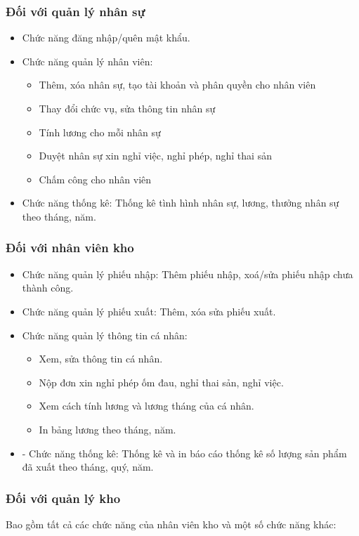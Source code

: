 \documentclass[a4paper,12pt]{report}
\begin{document}
\subsubsection{Đối với quản lý nhân sự}
\begin{itemize}
    \item Chức năng đăng nhập/quên mật khẩu.
    \item Chức năng quản lý nhân viên:
          \begin{itemize}
              \item Thêm, xóa nhân sự, tạo tài khoản và phân quyền cho nhân viên
              \item Thay đổi chức vụ, sửa thông tin nhân sự
              \item Tính lương cho mỗi nhân sự
              \item Duyệt nhân sự xin nghỉ việc, nghỉ phép, nghỉ thai sản
              \item Chấm công cho nhân viên
          \end{itemize}
    \item Chức năng thống kê: Thống kê tình hình nhân sự, lương, thưởng nhân sự theo tháng, năm.
\end{itemize}
\subsubsection{Đối với nhân viên kho}
\begin{itemize}
    \item Chức năng quản lý phiếu nhập: Thêm phiếu nhập, xoá/sửa phiếu nhập chưa thành công.
    \item Chức năng quản lý phiếu xuất: Thêm, xóa sửa phiếu xuất.
    \item Chức năng quản lý thông tin cá nhân:
          \begin{itemize}
              \item Xem, sửa thông tin cá nhân.
              \item Nộp đơn xin nghỉ phép ốm đau, nghỉ thai sản, nghỉ việc.
              \item Xem cách tính lương và lương tháng của cá nhân.
              \item In bảng lương theo tháng, năm.
          \end{itemize}
    \item -	Chức năng thống kê: Thống kê và in báo cáo thống kê số lượng sản phẩm đã xuất theo tháng, quý, năm.
\end{itemize}
\subsubsection{Đối với quản lý kho}
\quad Bao gồm tất cả các chức năng của nhân viên kho và một số chức năng khác:
\end{document}
